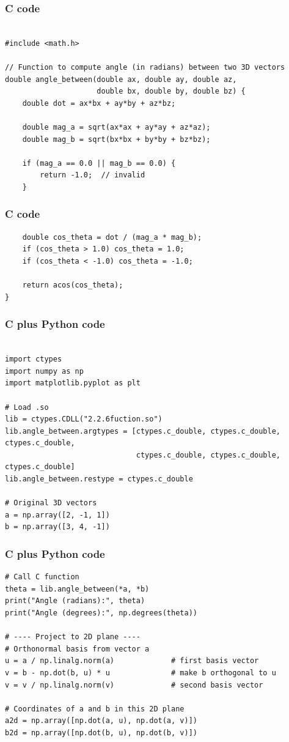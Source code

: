 \documentclass{beamer}
\begin{document}
\begin{frame}[fragile]
    \frametitle{C code}
    \begin{lstlisting}

#include <math.h>

// Function to compute angle (in radians) between two 3D vectors
double angle_between(double ax, double ay, double az,
                     double bx, double by, double bz) {
    double dot = ax*bx + ay*by + az*bz;

    double mag_a = sqrt(ax*ax + ay*ay + az*az);
    double mag_b = sqrt(bx*bx + by*by + bz*bz);

    if (mag_a == 0.0 || mag_b == 0.0) {
        return -1.0;  // invalid
    }
\end{lstlisting} 
\end{frame}
\begin{frame}[fragile]
    \frametitle{C code}
    \begin{lstlisting}
    double cos_theta = dot / (mag_a * mag_b);
    if (cos_theta > 1.0) cos_theta = 1.0;
    if (cos_theta < -1.0) cos_theta = -1.0;

    return acos(cos_theta);
}

\end{lstlisting} 
\end{frame}
\begin{frame}[fragile]
    \frametitle{C plus Python code}
    \begin{lstlisting}

import ctypes
import numpy as np
import matplotlib.pyplot as plt

# Load .so
lib = ctypes.CDLL("2.2.6fuction.so")
lib.angle_between.argtypes = [ctypes.c_double, ctypes.c_double, ctypes.c_double,
                              ctypes.c_double, ctypes.c_double, ctypes.c_double]
lib.angle_between.restype = ctypes.c_double

# Original 3D vectors
a = np.array([2, -1, 1])
b = np.array([3, 4, -1])
\end{lstlisting}
 
\end{frame}
\begin{frame}[fragile]
    \frametitle{C plus Python code}
    \begin{lstlisting}
# Call C function
theta = lib.angle_between(*a, *b)
print("Angle (radians):", theta)
print("Angle (degrees):", np.degrees(theta))

# ---- Project to 2D plane ----
# Orthonormal basis from vector a
u = a / np.linalg.norm(a)             # first basis vector
v = b - np.dot(b, u) * u              # make b orthogonal to u
v = v / np.linalg.norm(v)             # second basis vector

# Coordinates of a and b in this 2D plane
a2d = np.array([np.dot(a, u), np.dot(a, v)])
b2d = np.array([np.dot(b, u), np.dot(b, v)])
\end{lstlisting}
 
\end{frame}
\end{document}
